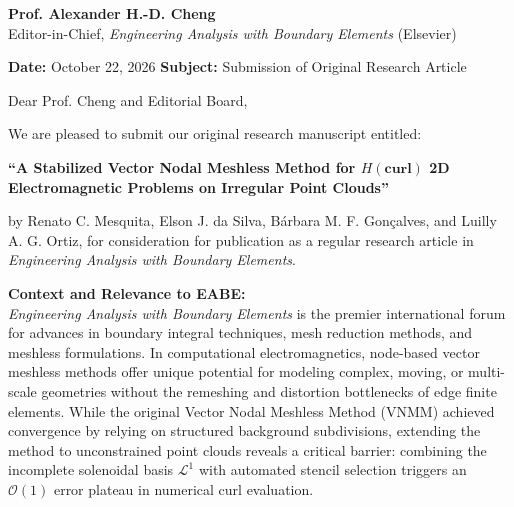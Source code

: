 \documentclass[10.5pt,a4paper]{article}
\begin{document}
\textbf{Prof. Alexander H.-D. Cheng} \\
Editor-in-Chief, \textit{Engineering Analysis with Boundary Elements} (Elsevier)

\textbf{Date:} October 22, 2026 \hfill \textbf{Subject:} Submission of Original Research Article

Dear Prof. Cheng and Editorial Board,

We are pleased to submit our original research manuscript entitled:
\begin{center}
\vspace{-0.2em}
\textbf{``A Stabilized Vector Nodal Meshless Method for $H(\mathbf{curl})$ 2D Electromagnetic Problems on Irregular Point Clouds''}
\vspace{-0.2em}
\end{center}
by Renato C. Mesquita, Elson J. da Silva, Bárbara M. F. Gonçalves, and Luilly A. G. Ortiz, for consideration for publication as a regular research article in \textit{Engineering Analysis with Boundary Elements}.

\textbf{Context and Relevance to EABE:} \\
\textit{Engineering Analysis with Boundary Elements} is the premier international forum for advances in boundary integral techniques, mesh reduction methods, and meshless formulations. In computational electromagnetics, node-based vector meshless methods offer unique potential for modeling complex, moving, or multi-scale geometries without the remeshing and distortion bottlenecks of edge finite elements. While the original Vector Nodal Meshless Method (VNMM) achieved convergence by relying on structured background subdivisions, extending the method to unconstrained point clouds reveals a critical barrier: combining the incomplete solenoidal basis $\mathcal{L}^1$ with automated stencil selection triggers an $\mathcal{O}(1)$ error plateau in numerical curl evaluation.
\end{document}
